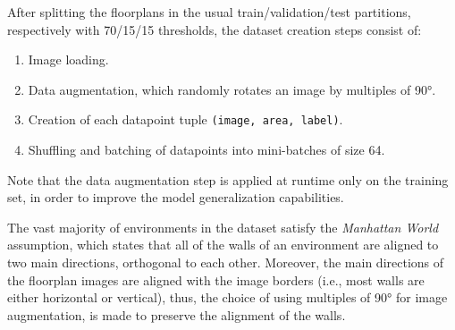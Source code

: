 After splitting the floorplans in the usual train/validation/test partitions, respectively with 70/15/15 thresholds, the dataset creation steps consist of:
\begin{enumerate}
    \item Image loading.
    \item Data augmentation, which randomly rotates an image by multiples of 90°.
    \item Creation of each datapoint tuple \texttt{(image, area, label)}.
    \item Shuffling and batching of datapoints into mini-batches of size 64.
\end{enumerate}
Note that the data augmentation step is applied at runtime only on the training set, in order to improve the model generalization capabilities. 

The vast majority of environments in the dataset satisfy the \textit{Manhattan World} assumption, which states that all of the walls of an environment are aligned to two main directions, orthogonal to each other. Moreover, the main directions of the floorplan images are aligned with the image borders (i.e.,  most walls are either horizontal or vertical), thus, the choice of using multiples of 90° for image augmentation, is made to preserve the alignment of the walls.

